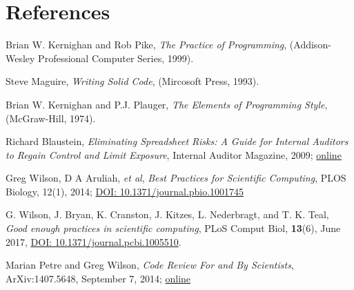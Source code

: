 \section{References}

\begingroup
\renewcommand{\section}[2]{}%

\begin{thebibliography}{99}
 Brian W. Kernighan and Rob Pike, \textit{The Practice of Programming}, (Addison-Wesley Professional Computer Series, 1999).

 Steve Maguire, \textit{Writing Solid Code}, (Mircosoft Press, 1993).
 
 Brian W. Kernighan and P.J. Plauger, \textit{The Elements of Programming Style}, (McGraw-Hill, 1974).

 Richard Blaustein, \textit{Eliminating Spreadsheet Risks: A Guide for Internal Auditors to Regain Control and Limit Exposure}, Internal Auditor Magazine, 2009; \href{http://www.analyticsolutions.com/index_files/page0017.htm}{online}

 Greg Wilson, D A Aruliah, \textit{et al}, \textit{Best Practices for Scientific Computing}, PLOS Biology, 12(1), 2014; \href{http://journals.plos.org/plosbiology/article?id=10.1371/journal.pbio.1001745}{DOI: 10.1371/journal.pbio.1001745}

G. Wilson, J. Bryan, K. Cranston, J. Kitzes, L. Nederbragt, and T. K. Teal, \textit{Good enough practices in scientific computing}, PLoS Comput Biol, \textbf{13}(6), June 2017, \href{https://journals.plos.org/ploscompbiol/article?id=10.1371/journal.pcbi.1005510}{DOI: 10.1371/journal.pcbi.1005510}.

 Marian Petre and Greg Wilson, \textit{Code Review For and By Scientists}, ArXiv:1407.5648, September 7, 2014; \href{http://arxiv.org/abs/1407.5648}{online}

\end{thebibliography}
\endgroup